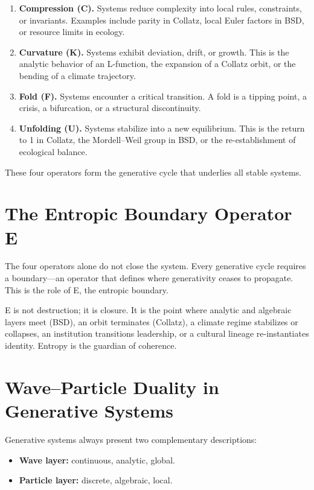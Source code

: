 \documentclass[14pt, twoside, openright]{book}
\theoremstyle{definition}
\theoremstyle{remark}
\begin{document}
\begin{enumerate}[leftmargin=2em]
  \item \textbf{Compression (C).} Systems reduce complexity into local rules,
        constraints, or invariants. Examples include parity in Collatz, local
        Euler factors in BSD, or resource limits in ecology.

  \item \textbf{Curvature (K).} Systems exhibit deviation, drift, or growth.
        This is the analytic behavior of an L-function, the expansion of a
        Collatz orbit, or the bending of a climate trajectory.

  \item \textbf{Fold (F).} Systems encounter a critical transition. A fold is a
        tipping point, a crisis, a bifurcation, or a structural discontinuity.

  \item \textbf{Unfolding (U).} Systems stabilize into a new equilibrium. This
        is the return to 1 in Collatz, the Mordell--Weil group in BSD, or the
        re-establishment of ecological balance.
\end{enumerate}

These four operators form the generative cycle that underlies all stable systems.

\section{The Entropic Boundary Operator E}

The four operators alone do not close the system. Every generative cycle requires
a boundary---an operator that defines where generativity ceases to propagate.
This is the role of E, the entropic boundary.

E is not destruction; it is closure. It is the point where analytic and algebraic
layers meet (BSD), an orbit terminates (Collatz), a climate regime stabilizes or
collapses, an institution transitions leadership, or a cultural lineage
re-instantiates identity. Entropy is the guardian of coherence.

\section{Wave--Particle Duality in Generative Systems}

Generative systems always present two complementary descriptions:

\begin{itemize}[leftmargin=2em]
  \item \textbf{Wave layer:} continuous, analytic, global.
  \item \textbf{Particle layer:} discrete, algebraic, local.
\end{itemize}
\end{document}
